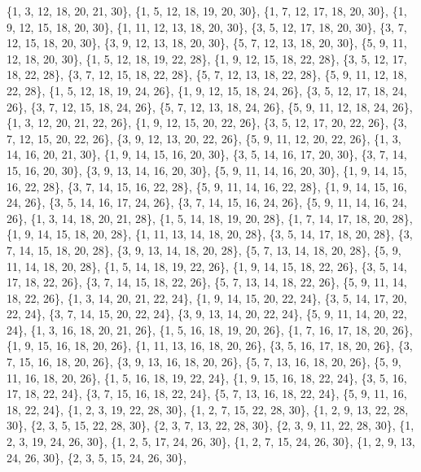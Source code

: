 \documentclass[11pt,a4paper]{article}
\begin{document}
{\{1, 3, 12, 18, 20, 21, 30\}, \{1, 5, 12, 18, 19, 20, 30\}, \{1, 7, 12, 17, 18, 20, 30\}, \{1, 9, 12, 15, 18, 20, 30\}, \{1, 11, 12, 13, 18, 20, 30\},
\{3, 5, 12, 17, 18, 20, 30\}, \{3, 7, 12, 15, 18, 20, 30\}, \{3, 9, 12, 13, 18, 20, 30\}, \{5, 7, 12, 13, 18, 20, 30\}, \{5, 9, 11, 12, 18, 20, 30\},
\{1, 5, 12, 18, 19, 22, 28\}, \{1, 9, 12, 15, 18, 22, 28\}, \{3, 5, 12, 17, 18, 22, 28\}, \{3, 7, 12, 15, 18, 22, 28\}, \{5, 7, 12, 13, 18, 22, 28\},
\{5, 9, 11, 12, 18, 22, 28\}, \{1, 5, 12, 18, 19, 24, 26\}, \{1, 9, 12, 15, 18, 24, 26\}, \{3, 5, 12, 17, 18, 24, 26\}, \{3, 7, 12, 15, 18, 24, 26\},
\{5, 7, 12, 13, 18, 24, 26\}, \{5, 9, 11, 12, 18, 24, 26\}, \{1, 3, 12, 20, 21, 22, 26\}, \{1, 9, 12, 15, 20, 22, 26\}, \{3, 5, 12, 17, 20, 22, 26\},
\{3, 7, 12, 15, 20, 22, 26\}, \{3, 9, 12, 13, 20, 22, 26\}, \{5, 9, 11, 12, 20, 22, 26\}, \{1, 3, 14, 16, 20, 21, 30\}, \{1, 9, 14, 15, 16, 20, 30\},
\{3, 5, 14, 16, 17, 20, 30\}, \{3, 7, 14, 15, 16, 20, 30\}, \{3, 9, 13, 14, 16, 20, 30\}, \{5, 9, 11, 14, 16, 20, 30\}, \{1, 9, 14, 15, 16, 22, 28\},
\{3, 7, 14, 15, 16, 22, 28\}, \{5, 9, 11, 14, 16, 22, 28\}, \{1, 9, 14, 15, 16, 24, 26\}, \{3, 5, 14, 16, 17, 24, 26\}, \{3, 7, 14, 15, 16, 24, 26\},
\{5, 9, 11, 14, 16, 24, 26\}, \{1, 3, 14, 18, 20, 21, 28\}, \{1, 5, 14, 18, 19, 20, 28\}, \{1, 7, 14, 17, 18, 20, 28\}, \{1, 9, 14, 15, 18, 20, 28\},
\{1, 11, 13, 14, 18, 20, 28\}, \{3, 5, 14, 17, 18, 20, 28\}, \{3, 7, 14, 15, 18, 20, 28\}, \{3, 9, 13, 14, 18, 20, 28\}, \{5, 7, 13, 14, 18, 20, 28\},
\{5, 9, 11, 14, 18, 20, 28\}, \{1, 5, 14, 18, 19, 22, 26\}, \{1, 9, 14, 15, 18, 22, 26\}, \{3, 5, 14, 17, 18, 22, 26\}, \{3, 7, 14, 15, 18, 22, 26\},
\{5, 7, 13, 14, 18, 22, 26\}, \{5, 9, 11, 14, 18, 22, 26\}, \{1, 3, 14, 20, 21, 22, 24\}, \{1, 9, 14, 15, 20, 22, 24\}, \{3, 5, 14, 17, 20, 22, 24\},
\{3, 7, 14, 15, 20, 22, 24\}, \{3, 9, 13, 14, 20, 22, 24\}, \{5, 9, 11, 14, 20, 22, 24\}, \{1, 3, 16, 18, 20, 21, 26\}, \{1, 5, 16, 18, 19, 20, 26\},
\{1, 7, 16, 17, 18, 20, 26\}, \{1, 9, 15, 16, 18, 20, 26\}, \{1, 11, 13, 16, 18, 20, 26\}, \{3, 5, 16, 17, 18, 20, 26\}, \{3, 7, 15, 16, 18, 20, 26\},
\{3, 9, 13, 16, 18, 20, 26\}, \{5, 7, 13, 16, 18, 20, 26\}, \{5, 9, 11, 16, 18, 20, 26\}, \{1, 5, 16, 18, 19, 22, 24\}, \{1, 9, 15, 16, 18, 22, 24\},
\{3, 5, 16, 17, 18, 22, 24\}, \{3, 7, 15, 16, 18, 22, 24\}, \{5, 7, 13, 16, 18, 22, 24\}, \{5, 9, 11, 16, 18, 22, 24\}, \{1, 2, 3, 19, 22, 28, 30\},
\{1, 2, 7, 15, 22, 28, 30\}, \{1, 2, 9, 13, 22, 28, 30\}, \{2, 3, 5, 15, 22, 28, 30\}, \{2, 3, 7, 13, 22, 28, 30\}, \{2, 3, 9, 11, 22, 28, 30\},
\{1, 2, 3, 19, 24, 26, 30\}, \{1, 2, 5, 17, 24, 26, 30\}, \{1, 2, 7, 15, 24, 26, 30\}, \{1, 2, 9, 13, 24, 26, 30\}, \{2, 3, 5, 15, 24, 26, 30\},
}
\end{document}
